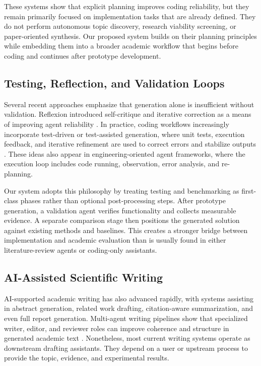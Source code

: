 \documentclass[11pt,a4paper]{article}
\begin{document}
These systems show that explicit planning improves coding reliability, but they remain primarily focused on implementation tasks that are already defined. They do not perform autonomous topic discovery, research viability screening, or paper-oriented synthesis. Our proposed system builds on their planning principles while embedding them into a broader academic workflow that begins before coding and continues after prototype development.

\subsection{Testing, Reflection, and Validation Loops}

Several recent approaches emphasize that generation alone is insufficient without validation. Reflexion introduced self-critique and iterative correction as a means of improving agent reliability \cite{reflexion2023}. In practice, coding workflows increasingly incorporate test-driven or test-assisted generation, where unit tests, execution feedback, and iterative refinement are used to correct errors and stabilize outputs \cite{addyworkflow2026}. These ideas also appear in engineering-oriented agent frameworks, where the execution loop includes code running, observation, error analysis, and re-planning.

Our system adopts this philosophy by treating testing and benchmarking as first-class phases rather than optional post-processing steps. After prototype generation, a validation agent verifies functionality and collects measurable evidence. A separate comparison stage then positions the generated solution against existing methods and baselines. This creates a stronger bridge between implementation and academic evaluation than is usually found in either literature-review agents or coding-only assistants.

\subsection{AI-Assisted Scientific Writing}

AI-supported academic writing has also advanced rapidly, with systems assisting in abstract generation, related work drafting, citation-aware summarization, and even full report generation. Multi-agent writing pipelines show that specialized writer, editor, and reviewer roles can improve coherence and structure in generated academic text \cite{lira2025}. Nonetheless, most current writing systems operate as downstream drafting assistants. They depend on a user or upstream process to provide the topic, evidence, and experimental results.
\end{document}
